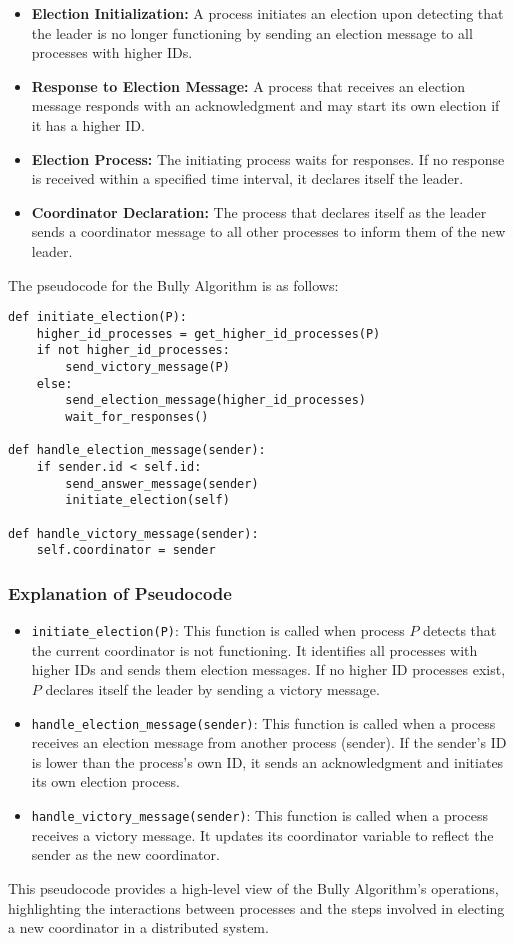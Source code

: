 \begin{itemize}
    \item \textbf{Election Initialization:} A process initiates an election upon detecting that the leader is no longer functioning by sending an election message to all processes with higher IDs.
    \item \textbf{Response to Election Message:} A process that receives an election message responds with an acknowledgment and may start its own election if it has a higher ID.
    \item \textbf{Election Process:} The initiating process waits for responses. If no response is received within a specified time interval, it declares itself the leader.
    \item \textbf{Coordinator Declaration:} The process that declares itself as the leader sends a coordinator message to all other processes to inform them of the new leader.
\end{itemize}
The pseudocode for the Bully Algorithm is as follows:

\begin{verbatim}
def initiate_election(P):
    higher_id_processes = get_higher_id_processes(P)
    if not higher_id_processes:
        send_victory_message(P)
    else:
        send_election_message(higher_id_processes)
        wait_for_responses()

def handle_election_message(sender):
    if sender.id < self.id:
        send_answer_message(sender)
        initiate_election(self)

def handle_victory_message(sender):
    self.coordinator = sender
\end{verbatim}

\subsubsection{Explanation of Pseudocode}

\begin{itemize}
    \item \texttt{initiate\_election(P)}: This function is called when process \(P\) detects that the current coordinator is not functioning. It identifies all processes with higher IDs and sends them election messages. If no higher ID processes exist, \(P\) declares itself the leader by sending a victory message.
    \item \texttt{handle\_election\_message(sender)}: This function is called when a process receives an election message from another process (sender). If the sender's ID is lower than the process's own ID, it sends an acknowledgment and initiates its own election process.
    \item \texttt{handle\_victory\_message(sender)}: This function is called when a process receives a victory message. It updates its coordinator variable to reflect the sender as the new coordinator.
\end{itemize}
This pseudocode provides a high-level view of the Bully Algorithm's operations, highlighting the interactions between processes and the steps involved in electing a new coordinator in a distributed system.

